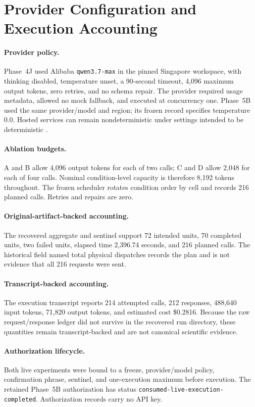 \section{Provider Configuration and Execution Accounting}
\label{supp:provider}

\paragraph{Provider policy.}
Phase~4J used Alibaba \texttt{qwen3.7-max} in the pinned Singapore workspace,
with thinking disabled, temperature unset, a 90-second timeout, 4,096 maximum
output tokens, zero retries, and no schema repair.  The provider required
usage metadata, allowed no mock fallback, and executed at concurrency one.
Phase~5B used the same provider/model and region; its frozen record specifies
temperature 0.0.  Hosted services can remain nondeterministic under settings
intended to be deterministic \citep{AtilEtAl2025Nondeterminism}.

\paragraph{Ablation budgets.}
A and B allow 4,096 output tokens for each of two calls; C and D allow 2,048
for each of four calls.  Nominal condition-level capacity is therefore 8,192
tokens throughout.  The frozen scheduler rotates condition order by cell and
records 216 planned calls.  Retries and repairs are zero.

\paragraph{Original-artifact-backed accounting.}
The recovered aggregate and sentinel support 72 intended units, 70 completed
units, two failed units, elapsed time 2,396.74 seconds, and 216 planned calls.
The historical field named total physical dispatches records the plan and is
not evidence that all 216 requests were sent.

\paragraph{Transcript-backed accounting.}
The execution transcript reports 214 attempted calls, 212 responses, 488,640
input tokens, 71,820 output tokens, and estimated cost \$0.2816.  Because the
raw request/response ledger did not survive in the recovered run directory,
these quantities remain transcript-backed and are not canonical scientific
evidence.

\paragraph{Authorization lifecycle.}
Both live experiments were bound to a freeze, provider/model policy,
confirmation phrase, sentinel, and one-execution maximum before execution.
The retained Phase~5B authorization has status
\texttt{consumed-live-execution-completed}.  Authorization records carry no
API key.
